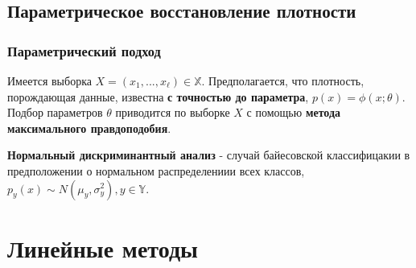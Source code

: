 \documentclass{beamer}
\begin{document}
	\subsection{Параметрическое восстановление плотности}
	
	\begin{frame}
		\frametitle{Параметрический подход}
		Имеется выборка $X = (x_1, ..., x_{\ell}) \in \mathbb{X}$. Предполагается, что плотность, порождающая данные, известна \textbf{с точностью до параметра}, $p(x) = \phi(x; \theta)$. Подбор параметров $\theta$ приводится по выборке $X$ с помощью \textbf{метода максимального правдоподобия}.
		
		\vspace{15pt}
		
		\textbf{Нормальный дискриминантный анализ} - случай байесовской классифицакии в предположении о нормальном распределениии всех классов, $p_y(x) \sim N(\mu_y, \sigma_y^2), y \in \mathbb{Y}$.
	\end{frame}
	
	\begin{frame}
		\frametitle{}
	\end{frame}
	
	\section{Линейные методы}
	
	
\end{document}
